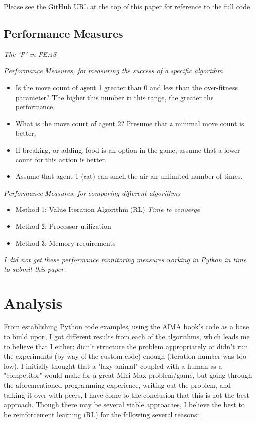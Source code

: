 \documentclass{article}
\begin{document}
Please see the GitHub URL at the top of this paper for reference to the full code.

\subsection{Performance Measures}
\textit{The `P' in PEAS}

\textit{Performance Measures, for measuring the success of a specific algorithm}
\begin{itemize}
  \item Is the move count of agent 1 greater than 0 and less than the over-fitness parameter? The higher this number in this range, the greater the performance.
  \item What is the move count of agent 2? Presume that a minimal move count is better.
  \item If breaking, or adding, food is an option in the game, assume that a lower count for this action is better.
  \item Assume that agent 1 (cat) can smell the air an unlimited number of times.
\end{itemize}

\textit{Performance Measures, for comparing different algorithms}

\begin{itemize}
  \item Method 1: Value Iteration Algorithm (RL) \cite{mohan2014}
  \textit{Time to converge}
  \item Method 2: Processor utilization
  \item Method 3: Memory requirements
\end{itemize}

\textit{I did not get these performance monitoring measures working in Python in time to submit this paper.}

\section{Analysis}

From establishing Python code examples, using the AIMA book's code as a base to build upon, I got different results from each of the algorithms, which leads me to believe that I either: didn't structure the problem appropriately or didn't run the experiments (by way of the custom code) enough (iteration number was too low). I initially thought that a "lazy animal" coupled with a human as a "competitor" would make for a great Mini-Max problem/game, but going through the aforementioned programming experience, writing out the problem, and talking it over with peers, I have come to the conclusion that this is not the best approach. Though there may be several viable approaches, I believe the best to be reinforcement learning (RL) for the following several reasons:
\end{document}
